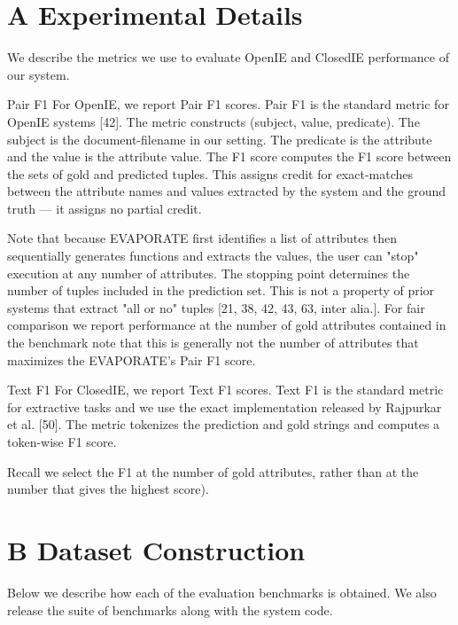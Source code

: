 \documentclass[10pt]{article}
\begin{document}
\section{A Experimental Details}
We describe the metrics we use to evaluate OpenIE and ClosedIE performance of our system.

Pair F1 For OpenIE, we report Pair F1 scores. Pair F1 is the standard metric for OpenIE systems [42]. The metric constructs (subject, value, predicate). The subject is the document-filename in our setting. The predicate is the attribute and the value is the attribute value. The F1 score computes the F1 score between the sets of gold and predicted tuples. This assigns credit for exact-matches between the attribute names and values extracted by the system and the ground truth — it assigns no partial credit.

Note that because EVAPORATE first identifies a list of attributes then sequentially generates functions and extracts the values, the user can "stop" execution at any number of attributes. The stopping point determines the number of tuples included in the prediction set. This is not a property of prior systems that extract "all or no" tuples [21, 38, 42, 43, 63, inter alia.]. For fair comparison we report performance at the number of gold attributes contained in the benchmark note that this is generally not the number of attributes that maximizes the EVAPORATE's Pair F1 score.

Text F1 For ClosedIE, we report Text F1 scores. Text F1 is the standard metric for extractive tasks and we use the exact implementation released by Rajpurkar et al. [50]. The metric tokenizes the prediction and gold strings and computes a token-wise F1 score.

Recall we select the F1 at the number of gold attributes, rather than at the number that gives the highest score).

\section{B Dataset Construction}
Below we describe how each of the evaluation benchmarks is obtained. We also release the suite of benchmarks along with the system code.
\end{document}
